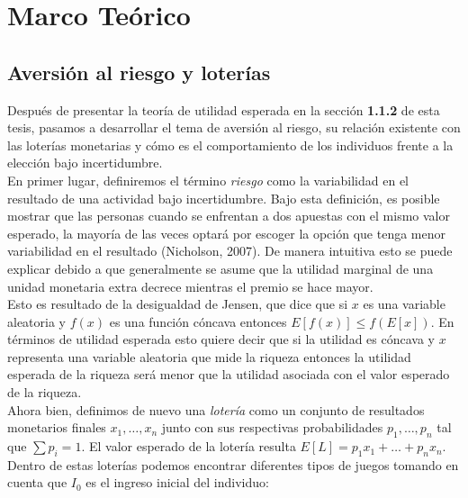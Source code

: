 \chapter{Marco Teórico}


\newpage

\section{Aversión al riesgo y loterías}

\noindent Después de presentar la teoría de utilidad esperada en la sección \textbf{1.1.2} de esta tesis, pasamos a desarrollar el tema de aversión al riesgo, su relación existente con las loterías monetarias y cómo es el comportamiento de los individuos frente a la elección bajo incertidumbre. \\

En primer lugar, definiremos el término \textit{riesgo} como la variabilidad en el resultado de una actividad bajo incertidumbre. Bajo esta definición, es posible mostrar que las personas cuando se enfrentan a dos apuestas con el mismo valor esperado, la mayoría de las veces optará por escoger la opción que tenga menor variabilidad en el resultado (Nicholson, 2007). De manera intuitiva esto se puede explicar debido a que generalmente se asume que la utilidad marginal de una unidad monetaria extra decrece mientras el premio se hace mayor. \\

Esto es resultado de la desigualdad de Jensen, que dice que si $x$ es una variable aleatoria y $f(x)$ es una función cóncava entonces $E[f(x)] \leq f(E[x])$. En términos de utilidad esperada esto quiere decir que si la utilidad es cóncava y $x$ representa una variable aleatoria que mide la riqueza entonces la utilidad esperada de la riqueza será menor que la utilidad asociada con el valor esperado de la riqueza. \\


Ahora bien, definimos de nuevo una \textit{lotería} como un conjunto de resultados monetarios finales $x_1,\dots,x_n$ junto con sus respectivas probabilidades $p_1,\dots,p_n$ tal que $\sum p_i = 1$. El valor esperado de la lotería resulta $E[L] = p_1x_1 + \dots + p_nx_n$. Dentro de estas loterías podemos encontrar diferentes tipos de juegos tomando en cuenta que $I_0$ es el ingreso inicial del individuo: 

